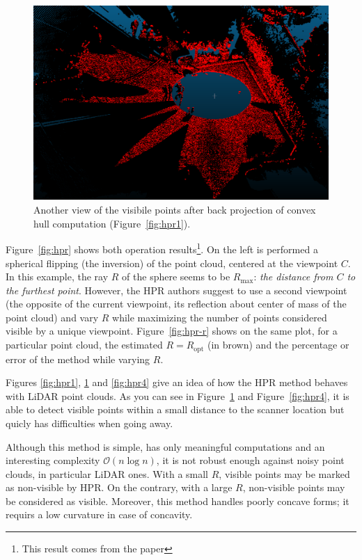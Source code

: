 \begin{figure}
  \centering
  \includegraphics[scale=0.45]{img/hpr3.png}
  \caption{Another view of the visibile points after back projection of convex hull computation (Figure~\ref{fig:hpr1}).}
  \label{fig:hpr3}
\end{figure}


Figure~\ref{fig:hpr} shows both operation results\footnote{This result comes from the paper}. On the left is performed a spherical flipping (the inversion) of the point cloud, centered at the viewpoint $C$. In this example, the ray $R$ of the sphere seems to be $R_\text{max}$: \emph{the distance from $C$ to the furthest point}. However, the HPR authors suggest to use a second viewpoint (the opposite of the current viewpoint, its reflection about center of mass of the point cloud) and vary $R$ while maximizing the number of points considered visible by a unique viewpoint. Figure~\ref{fig:hpr-r} shows on the same plot, for a particular point cloud, the estimated $R=R_\text{opt}$ (in brown) and the percentage or error of the method while varying $R$.

Figures \ref{fig:hpr1}, \ref{fig:hpr3} and \ref{fig:hpr4} give an idea of how the HPR method behaves with LiDAR point clouds. As you can see in Figure~\ref{fig:hpr3} and Figure~\ref{fig:hpr4}, it is able to detect visible points within a small distance to the scanner location but quicly has difficulties when going away.

Although this method is simple, has only meaningful computations and an interesting complexity $\mathcal{O}(n\log{}n)$, it is not robust enough against noisy point clouds, in particular LiDAR ones. With a small $R$, visible points may be marked as non-visible by HPR. On the contrary, with a large $R$, non-visible points may be considered as visible. Moreover, this method handles poorly concave forms; it requirs a low curvature in case of concavity.


